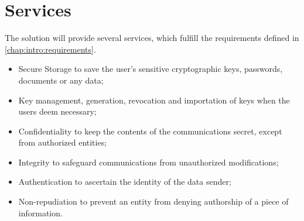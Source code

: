 \section{Services} \label{chap:requirements:services}

The solution will provide several services, which fulfill the requirements defined in \ref{chap:intro:requirements}.

\begin{itemize}
    \item Secure Storage to save the user's sensitive cryptographic keys, passwords, documents or any data;
    \item Key management, generation, revocation and importation of keys when the users deem necessary;
    \item Confidentiality to keep the contents of the communications secret, except from authorized entities;
    \item Integrity to safeguard communications from unauthorized modifications;
    \item Authentication to ascertain the identity of the data sender;
    \item Non-repudiation to prevent an entity from denying authorship of a piece of information.
\end{itemize}
